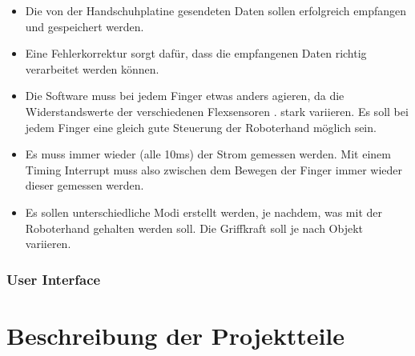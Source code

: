 \documentclass[11pt]{article}
\begin{document}
	\begin{itemize}
		\item Die von der Handschuhplatine gesendeten Daten sollen erfolgreich empfangen und gespeichert werden.
		\item Eine Fehlerkorrektur sorgt dafür, dass die empfangenen Daten richtig verarbeitet werden können.
		\item Die Software muss bei jedem Finger etwas anders agieren, da die Widerstandswerte der verschiedenen 
		      Flexsensoren .
			  stark variieren. Es soll bei jedem Finger eine gleich gute Steuerung der Roboterhand möglich sein.
		\item Es muss immer wieder (alle 10ms) der Strom gemessen werden. Mit einem Timing Interrupt muss also zwischen 
		      dem Bewegen der Finger immer wieder dieser gemessen werden.
		\item Es sollen unterschiedliche Modi erstellt werden, je nachdem, was mit der Roboterhand gehalten werden soll. 
			  Die Griffkraft soll je nach Objekt variieren.
	\end{itemize}

\subsubsection{User Interface}
\section{Beschreibung der Projektteile}
\end{document}
